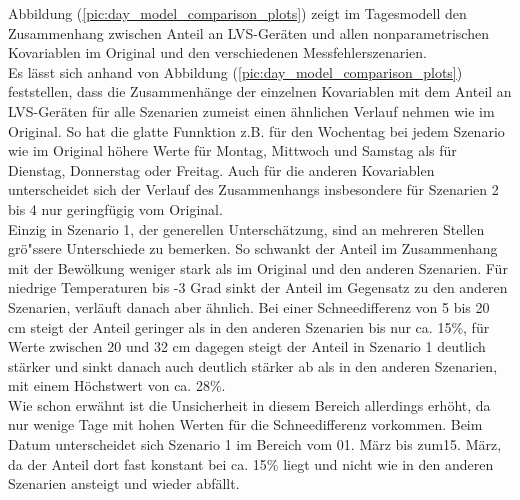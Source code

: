 \documentclass[12pt]{scrreprt}
\begin{document}
\noindent Abbildung (\ref{pic:day_model_comparison_plots}) zeigt im Tagesmodell den Zusammenhang zwischen Anteil an LVS-Geräten und allen nonparametrischen Kovariablen im Original und den verschiedenen Messfehlerszenarien. \\
Es lässt sich anhand von Abbildung (\ref{pic:day_model_comparison_plots}) feststellen, dass die Zusammenhänge der einzelnen Kovariablen mit dem Anteil an LVS-Geräten für alle Szenarien zumeist einen ähnlichen Verlauf nehmen wie im Original. So hat die glatte Funnktion z.B. für den Wochentag bei jedem Szenario wie im Original höhere Werte für Montag, Mittwoch und Samstag als für Dienstag, Donnerstag oder Freitag. Auch für die anderen Kovariablen unterscheidet sich der Verlauf des Zusammenhangs insbesondere für Szenarien 2 bis 4 nur geringfügig vom Original. \\
Einzig in Szenario 1, der generellen Unterschätzung, sind an mehreren Stellen grö"ssere Unterschiede zu bemerken. So schwankt der Anteil im Zusammenhang mit der Bewölkung  weniger stark als im Original und den anderen Szenarien. Für niedrige Temperaturen bis -3 Grad sinkt der Anteil im Gegensatz zu den anderen Szenarien, verläuft danach aber ähnlich. Bei einer Schneedifferenz von 5 bis 20 cm steigt der Anteil geringer als in den anderen Szenarien bis nur ca. 15\%, für Werte zwischen 20 und 32 cm dagegen steigt der Anteil in Szenario 1 deutlich stärker und sinkt danach auch deutlich stärker ab als in den anderen Szenarien, mit einem Höchstwert von ca. 28\%. \\
Wie schon erwähnt ist die Unsicherheit in diesem Bereich allerdings erhöht, da nur wenige Tage mit hohen Werten für die Schneedifferenz vorkommen. Beim Datum unterscheidet sich Szenario 1 im Bereich vom 01. März bis zum15. März, da der Anteil dort fast konstant bei ca. 15\% liegt und nicht wie in den anderen Szenarien ansteigt und wieder abfällt.
\end{document}
